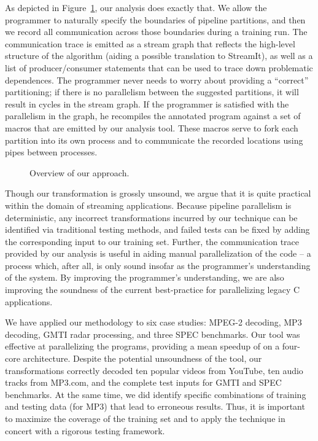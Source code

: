 
As depicted in Figure~\ref{fig:overview}, our analysis does exactly
that.  We allow the programmer to naturally specify the boundaries of
pipeline partitions, and then we record all communication across those
boundaries during a training run.  The communication trace is emitted
as a stream graph that reflects the high-level structure of the
algorithm (aiding a possible translation to StreamIt), as well as a
list of producer/consumer statements that can be used to trace down
problematic dependences.  The programmer never needs to worry about
providing a ``correct'' partitioning; if there is no parallelism
between the suggested partitions, it will result in cycles in the
stream graph.  If the programmer is satisfied with the parallelism in
the graph, he recompiles the annotated program against a set of macros
that are emitted by our analysis tool.  These macros serve to fork
each partition into its own process and to communicate the recorded
locations using pipes between processes.

\begin{figure}[t]
\hspace{-0.25in}
\vspace{-18pt}
\caption{Overview of our approach.\protect\label{fig:overview}}
\vspace{-6pt}
\end{figure}

Though our transformation is grossly unsound, we argue that it is
quite practical within the domain of streaming applications.  Because
pipeline parallelism is deterministic, any incorrect transformations
incurred by our technique can be identified via traditional testing
methods, and failed tests can be fixed by adding the corresponding
input to our training set.  Further, the communication trace provided
by our analysis is useful in aiding manual parallelization of the code
-- a process which, after all, is only sound insofar as the
programmer's understanding of the system.  By improving the
programmer's understanding, we are also improving the soundness of the
current best-practice for parallelizing legacy C applications.

We have applied our methodology to six case studies: MPEG-2 decoding,
MP3 decoding, GMTI radar processing, and three SPEC benchmarks.  Our
tool was effective at parallelizing the programs, providing a mean
speedup of {\meanspeedup} on a four-core architecture.  Despite the
potential unsoundness of the tool, our transformations correctly
decoded ten popular videos from YouTube, ten audio tracks from
MP3.com, and the complete test inputs for GMTI and SPEC benchmarks.
At the same time, we did identify specific combinations of training
and testing data (for MP3) that lead to erroneous results.  Thus, it
is important to maximize the coverage of the training set and to apply
the technique in concert with a rigorous testing framework.

